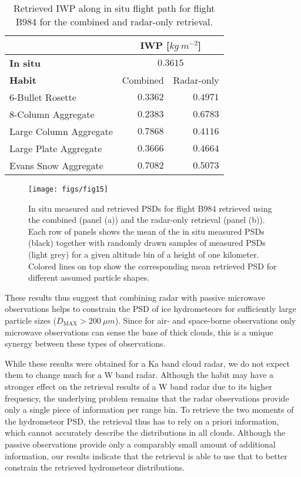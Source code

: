 \documentclass[journal abbreviation, manuscript]{copernicus}
\begin{document}
\begin{table}
  \centering
  \caption{Retrieved IWP along in situ flight path for flight B984 for the
    combined and radar-only retrieval.}
  \label{tab:iwp}
\begin{tabular}{l|rr}
   & \multicolumn{2}{c}{IWP [$\unit{kg\ m^{-2}}$] } \\
  \hline
  \hline
\textbf{In situ} & \multicolumn{2}{c}{$0.3615 $} \\
\hline
 \textbf{Habit} & Combined & Radar-only \\
6-Bullet Rosette & $0.3362  $ & $0.4971  $ \\ 
8-Column Aggregate & $0.2383  $ & $0.6783  $ \\ 
Large Column Aggregate & $0.7868  $ & $0.4116  $ \\ 
Large Plate Aggregate & $0.3666  $ & $0.4664  $ \\ 
Evans Snow Aggregate & $0.7082  $ & $0.5073  $ \\ 
\end{tabular}
\end{table}

\begin{figure}[!hbpt]
  \centering
  \texttt{[image: figs/fig15]}
  \caption{In situ measured and retrieved PSDs for flight B984
    retrieved using the combined (panel (a)) and the radar-only retrieval
    (panel (b)). Each row of panels shows the mean of the in situ measured
    PSDs (black) together with randomly drawn samples of measured PSDs
    (light grey) for a given altitude bin of a height of one kilometer.
    Colored lines on top show the corresponding mean retrieved PSD for
    different assumed particle shapes.}
  \label{fig:in_situ_psds_radar_only}
\end{figure}

These results thus suggest that combining radar with passive microwave
observations helps to constrain the PSD of ice hydrometeors for sufficiently
large particle sizes ($D_\text{MAX} > 200\ \unit{\mu m}$). Since for air- and
space-borne observations only microwave observations can sense the base of thick
clouds, this is a unique synergy between these types of observations.

While these results were obtained for a Ka band cloud radar, we do not expect
them to change much for a W band radar. Although the habit may have a stronger
effect on the retrieval results of a W band radar due to its higher frequency,
the underlying problem remains that the radar observations provide only a single
piece of information per range bin. To retrieve the two moments of the
hydrometeor PSD, the retrieval thus has to rely on a priori information, which
cannot accurately describe the distributions in all clouds. Although the passive
observations provide only a comparably small amount of additional information,
our results indicate that the retrieval is able to use that to better constrain
the retrieved hydrometeor distributions.
\end{document}
